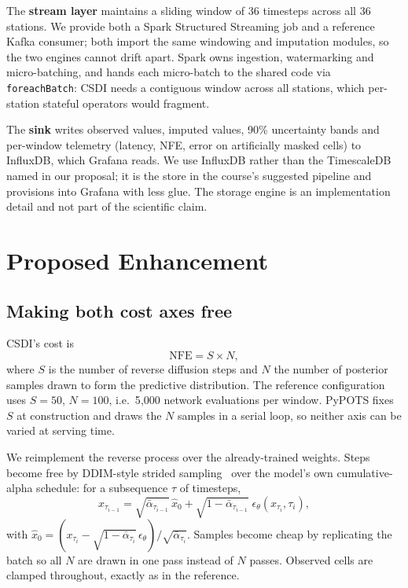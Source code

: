 \documentclass[conference]{IEEEtran}
\begin{document}
The \textbf{stream layer} maintains a sliding window of 36 timesteps across all
36 stations. We provide both a Spark Structured Streaming job and a reference
Kafka consumer; both import the same windowing and imputation modules, so the
two engines cannot drift apart. Spark owns ingestion, watermarking and
micro-batching, and hands each micro-batch to the shared code via
\texttt{foreachBatch}: CSDI needs a contiguous window across all stations, which
per-station stateful operators would fragment.

The \textbf{sink} writes observed values, imputed values, 90\% uncertainty
bands and per-window telemetry (latency, NFE, error on artificially masked
cells) to InfluxDB, which Grafana reads. We use InfluxDB rather than the
TimescaleDB named in our proposal; it is the store in the course's suggested
pipeline and provisions into Grafana with less glue. The storage engine is an
implementation detail and not part of the scientific claim.

\section{Proposed Enhancement}
\label{sec:enh}

\subsection{Making both cost axes free}

CSDI's cost is
\begin{equation}
\mathrm{NFE} = S \times N,
\end{equation}
where $S$ is the number of reverse diffusion steps and $N$ the number of
posterior samples drawn to form the predictive distribution. The reference
configuration uses $S=50$, $N=100$, i.e.\ 5{,}000 network evaluations per
window. PyPOTS fixes $S$ at construction and draws the $N$ samples in a serial
loop, so neither axis can be varied at serving time.

We reimplement the reverse process over the already-trained weights. Steps
become free by DDIM-style strided sampling~\cite{ddim} over the model's own
cumulative-alpha schedule: for a subsequence $\tau$ of timesteps,
\begin{equation}
x_{\tau_{i-1}} = \sqrt{\bar\alpha_{\tau_{i-1}}}\,\hat{x}_0
  + \sqrt{1-\bar\alpha_{\tau_{i-1}}}\;\epsilon_\theta(x_{\tau_i}, \tau_i),
\end{equation}
with $\hat{x}_0 = (x_{\tau_i} - \sqrt{1-\bar\alpha_{\tau_i}}\,\epsilon_\theta)
/\sqrt{\bar\alpha_{\tau_i}}$. Samples become cheap by replicating the batch so
all $N$ are drawn in one pass instead of $N$ passes. Observed cells are clamped
throughout, exactly as in the reference.
\end{document}

